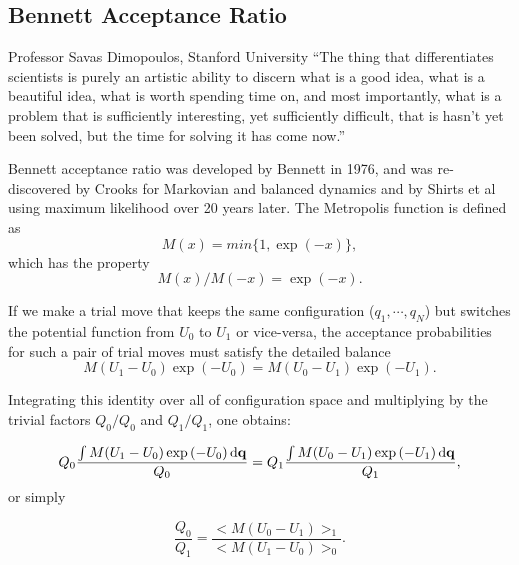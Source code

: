 \subsection{Bennett Acceptance Ratio\label{Sec:FEM:BAR}}
\begin{chapquote}{Professor Savas Dimopoulos, Stanford University}
	``The thing that differentiates scientists is purely an artistic ability to discern what is a good idea, what is a beautiful idea, what is worth spending time on, and most importantly, what is a problem that is sufficiently interesting, yet sufficiently difficult, that is hasn't yet been solved, but the time for solving it has come now.''
\end{chapquote}
Bennett acceptance ratio was developed by Bennett in 1976,\cite{BennettJComputPhys1976} and was re-discovered by Crooks\cite{CrooksPRE2000} for Markovian and balanced dynamics and by Shirts et al\cite{ShirtsPRL2003} using maximum likelihood over 20 years later. The Metropolis function is defined as
\begin{equation}
	M(x)=min\{1,\exp{(-x)}\},
\end{equation}
which has the property 
\begin{equation}
	M(x)/M(-x)=\exp{(-x)}.
\end{equation}

If we make a trial move that keeps the same configuration ($q_{1},\cdots,q_{N}$)
but switches the potential function from $U_{0}$ to $U_{1}$ or vice-versa, 
the acceptance probabilities for such a pair of trial moves must satisfy
the detailed balance
\begin{equation}
	M(U_{1}-U_{0})\exp{(-U_{0})}=M(U_{0}-U_{1})\exp{(-U_{1})}.
\end{equation}

Integrating this identity over all of configuration space and multiplying
by the trivial factors $Q_{0}/Q_{0}$ and $Q_{1}/Q_{1}$, one obtains:

\begin{equation}
	Q_{0}\frac{\int M(U_{1}-U_{0})\exp{(-U_{0})}\mathop{}\!\mathrm{d}\mathbf{{q}}}{Q_{0}}=Q_{1}\frac{\int M(U_{0}-U_{1})\exp{(-U_{1})}\mathop{}\!\mathrm{d}\mathbf{{q}}}{Q_{1}},
\end{equation}
or simply

\begin{equation}
	\frac{Q_{0}}{Q_{1}}=\frac{<M(U_{0}-U_{1})>_{1}}{<M(U_{1}-U_{0})>_{0}}.\label{eq:FEM:BAR:MetropolisRatio}
\end{equation}

